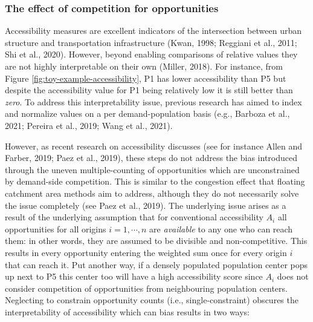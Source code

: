 \documentclass[]{elsarticle} %
\begin{document}
\hypertarget{the-effect-of-competition-for-opportunities}{%
\subsubsection{The effect of competition for
opportunities}\label{the-effect-of-competition-for-opportunities}}

Accessibility measures are excellent indicators of the intersection
between urban structure and transportation infrastructure (Kwan, 1998;
Reggiani et al., 2011; Shi et al., 2020). However, beyond enabling
comparisons of relative values they are not highly interpretable on
their own (Miller, 2018). For instance, from Figure
\ref{fig:toy-example-accessibility}, P1 has lower accessibility than P5
but despite the accessibility value for P1 being relatively low it is
still better than \emph{zero}. To address this interpretability issue,
previous research has aimed to index and normalize values on a per
demand-population basis (e.g., Barboza et al., 2021; Pereira et al.,
2019; Wang et al., 2021).

However, as recent research on accessibility discusses (see for instance
Allen and Farber, 2019; Paez et al., 2019), these steps do not address
the bias introduced through the uneven multiple-counting of
opportunities which are unconstrained by demand-side competition. This
is similar to the congestion effect that floating catchment area methods
aim to address, although they do not necessarily solve the issue
completely (see Paez et al., 2019). The underlying issue arises as a
result of the underlying assumption that for conventional accessibility
\(A_i\) all opportunities for all origins \(i=1,\cdots,n\) are
\emph{available} to any one who can reach them: in other words, they are
assumed to be divisible and non-competitive. This results in every
opportunity entering the weighted sum once for every origin \(i\) that
can reach it. Put another way, if a densely populated population center
pops up next to P5 this center too will have a high accessibility score
since \(A_i\) does not consider competition of opportunities from
neighbouring population centers. Neglecting to constrain opportunity
counts (i.e., single-constraint) obscures the interpretability of
accessibility which can bias results in two ways:
\end{document}
